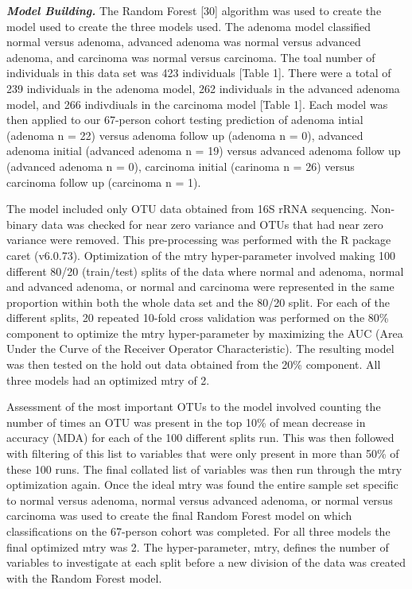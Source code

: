 \documentclass[12pt,]{article}
\begin{document}
\textbf{\emph{Model Building.}} The Random Forest {[}30{]} algorithm was
used to create the model used to create the three models used. The
adenoma model classified normal versus adenoma, advanced adenoma was
normal versus advanced adenoma, and carcinoma was normal versus
carcinoma. The toal number of individuals in this data set was 423
individuals {[}Table 1{]}. There were a total of 239 individuals in the
adenoma model, 262 individuals in the advanced adenoma model, and 266
indivdiuals in the carcinoma model {[}Table 1{]}. Each model was then
applied to our 67-person cohort testing prediction of adenoma intial
(adenoma n = 22) versus adenoma follow up (adenoma n = 0), advanced
adenoma initial (advanced adenoma n = 19) versus advanced adenoma follow
up (advanced adenoma n = 0), carcinoma initial (carinoma n = 26) versus
carcinoma follow up (carcinoma n = 1).

The model included only OTU data obtained from 16S rRNA sequencing.
Non-binary data was checked for near zero variance and OTUs that had
near zero variance were removed. This pre-processing was performed with
the R package caret (v6.0.73). Optimization of the mtry hyper-parameter
involved making 100 different 80/20 (train/test) splits of the data
where normal and adenoma, normal and advanced adenoma, or normal and
carcinoma were represented in the same proportion within both the whole
data set and the 80/20 split. For each of the different splits, 20
repeated 10-fold cross validation was performed on the 80\% component to
optimize the mtry hyper-parameter by maximizing the AUC (Area Under the
Curve of the Receiver Operator Characteristic). The resulting model was
then tested on the hold out data obtained from the 20\% component. All
three models had an optimized mtry of 2.

Assessment of the most important OTUs to the model involved counting the
number of times an OTU was present in the top 10\% of mean decrease in
accuracy (MDA) for each of the 100 different splits run. This was then
followed with filtering of this list to variables that were only present
in more than 50\% of these 100 runs. The final collated list of
variables was then run through the mtry optimization again. Once the
ideal mtry was found the entire sample set specific to normal versus
adenoma, normal versus advanced adenoma, or normal versus carcinoma was
used to create the final Random Forest model on which classifications on
the 67-person cohort was completed. For all three models the final
optimized mtry was 2. The hyper-parameter, mtry, defines the number of
variables to investigate at each split before a new division of the data
was created with the Random Forest model.
\end{document}
